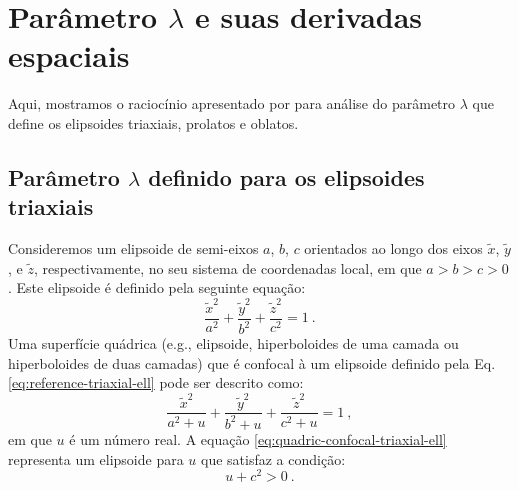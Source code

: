 \chapter{Parâmetro $\lambda$ e suas derivadas espaciais}

Aqui, mostramos o raciocínio apresentado por \citet{webster1904}
para análise do parâmetro $\lambda$ que define os elipsoides triaxiais, prolatos e oblatos.

\section{Parâmetro $\lambda$ definido para os elipsoides triaxiais}

Consideremos um elipsoide de semi-eixos $a$, $b$, $c$ orientados ao longo dos eixos
$\tilde{x}$, $\tilde{y}$, e $\tilde{z}$, respectivamente, no seu sistema de coordenadas
local, em que $a > b > c > 0$. Este elipsoide é definido pela seguinte equação:
\begin{equation}
\frac{\tilde{x}^{2}}{a^{2}} + \frac{\tilde{y}^{2}}{b^{2}} + \frac{\tilde{z}^{2}}{c^{2}} = 1 \: .
\label{eq:reference-triaxial-ell}
\end{equation}
Uma superfície quádrica (e.g., elipsoide, hiperboloides de uma camada ou 
hiperboloides de duas camadas) que é confocal à um elipsoide definido pela
Eq. \ref{eq:reference-triaxial-ell} pode ser descrito como:
\begin{equation}
\frac{\tilde{x}^{2}}{a^{2} + u} + \frac{\tilde{y}^{2}}{b^{2} + u} + \frac{\tilde{z}^{2}}{c^{2} + u} = 1 \: ,
\label{eq:quadric-confocal-triaxial-ell}
\end{equation}
em que $u$ é um número real. A equação \ref{eq:quadric-confocal-triaxial-ell}
representa um elipsoide para $u$ que satisfaz a condição:
\begin{equation}
u + c^{2} > 0 \: .
\label{eq:condition-triaxial-ell}
\end{equation}

